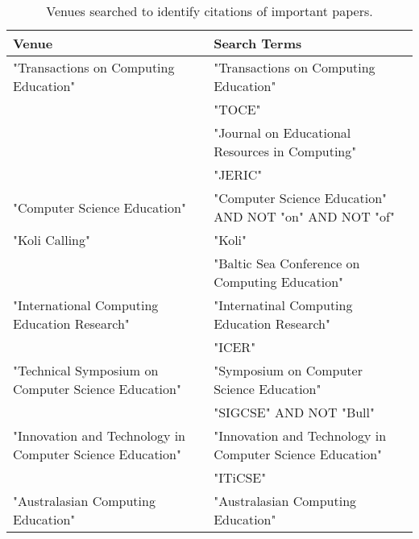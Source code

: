 \begin{table*}[t]
\begin{tabular}{ll}
Venue & Search Terms\\\hline
"Transactions on Computing Education" & "Transactions on Computing Education"\\
& "TOCE"\\
& "Journal on Educational Resources in Computing"\\
& "JERIC"\\
"Computer Science Education" & "Computer Science Education" AND NOT "on" AND NOT "of"\\
"Koli Calling" & "Koli"\\
& "Baltic Sea Conference on Computing Education"\\
"International Computing Education Research" & "Internatinal Computing Education Research"\\
& "ICER"\\
"Technical Symposium on Computer Science Education" & "Symposium on Computer Science Education"\\
& "SIGCSE" AND NOT "Bull"\\
"Innovation and Technology in Computer Science Education" & "Innovation and Technology in Computer Science Education"\\
& "ITiCSE"\\
"Australasian Computing Education" & "Australasian Computing Education"
\end{tabular}
\caption{Venues searched to identify citations of important papers.}
\end{table*}